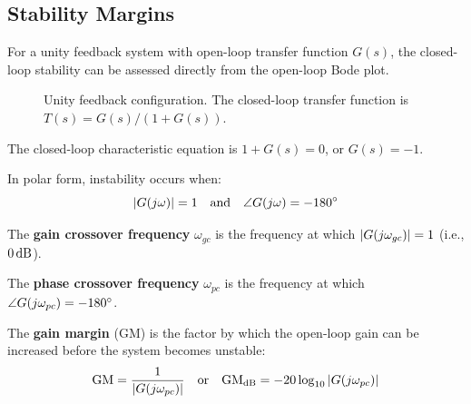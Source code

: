 \subsection{Stability Margins}
\label{sec:stability_margins}

For a unity feedback system with open-loop transfer function $G(s)$, the closed-loop stability can be assessed directly from the open-loop Bode plot.

\begin{figure}[htbp]
\centering
{}
\caption{Unity feedback configuration. The closed-loop transfer function is $T(s) = G(s)/(1+G(s))$.}
\label{fig:unity_feedback}
\end{figure}

The closed-loop characteristic equation is $1 + G(s) = 0$, or $G(s) = -1$.

In polar form, instability occurs when:
\begin{equation}
\left|G(j\omega)\right| = 1 \quad \text{and} \quad \angle G(j\omega) = -180^\circ
\label{eq:instability_condition}
\end{equation}

\begin{definition}
The \textbf{gain crossover frequency} $\omega_{gc}$ is the frequency at which $\left|G(j\omega_{gc})\right| = 1$ (i.e., $0\,\text{dB}$).
\end{definition}

\begin{definition}
The \textbf{phase crossover frequency} $\omega_{pc}$ is the frequency at which $\angle G(j\omega_{pc}) = -180^\circ$.
\end{definition}

\begin{definition}
The \textbf{gain margin} (GM) is the factor by which the open-loop gain can be increased before the system becomes unstable:
\begin{equation}
\text{GM} = \frac{1}{\left|G(j\omega_{pc})\right|} \quad \text{or} \quad \text{GM}_{\text{dB}} = -20\log_{10}\left|G(j\omega_{pc})\right|
\label{eq:gain_margin}
\end{equation}
\end{definition}

